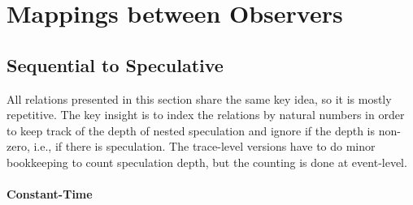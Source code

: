 \documentclass[12pt]{article}
\begin{document}
\section{Mappings between Observers}

\subsection{Sequential to Speculative}

All relations presented in this section share the same key idea, so it is mostly repetitive. 
The key insight is to index the relations by natural numbers in order to keep track of the depth of nested speculation and ignore if the depth is non-zero, i.e., if there is speculation.
The trace-level versions have to do minor bookkeeping to count speculation depth, but the counting is done at event-level.

\paragraph{Constant-Time} $\;$\\
\end{document}
